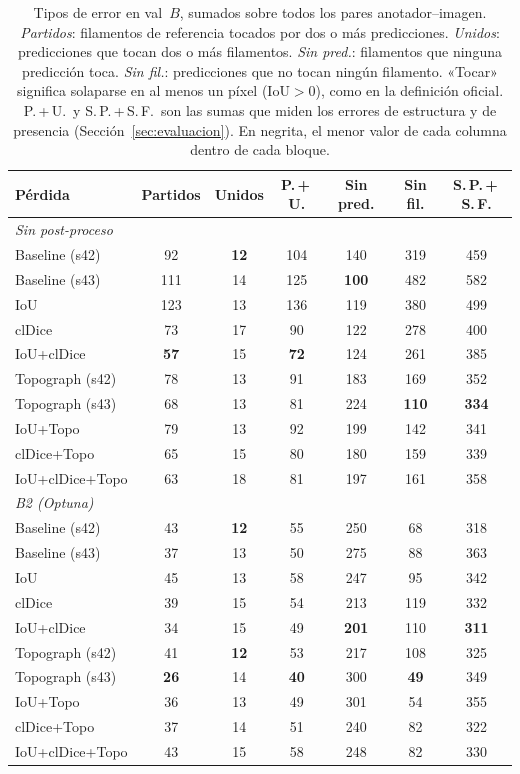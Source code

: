 \begin{table}[htbp]
\centering
\small
\begin{tabular}{@{}lcccccc@{}}
\toprule
Pérdida & Partidos & Unidos & P.\,+\,U. & Sin pred. & Sin fil. & S.\,P.\,+\,S.\,F.\\
\midrule
\multicolumn{7}{l}{\emph{Sin post-proceso}}\\
Baseline (s42) & 92 & \textbf{12} & 104 & 140 & 319 & 459\\
Baseline (s43) & 111 & 14 & 125 & \textbf{100} & 482 & 582\\
IoU & 123 & 13 & 136 & 119 & 380 & 499\\
clDice & 73 & 17 & 90 & 122 & 278 & 400\\
IoU+clDice & \textbf{57} & 15 & \textbf{72} & 124 & 261 & 385\\
Topograph (s42) & 78 & 13 & 91 & 183 & 169 & 352\\
Topograph (s43) & 68 & 13 & 81 & 224 & \textbf{110} & \textbf{334}\\
IoU+Topo & 79 & 13 & 92 & 199 & 142 & 341\\
clDice+Topo & 65 & 15 & 80 & 180 & 159 & 339\\
IoU+clDice+Topo & 63 & 18 & 81 & 197 & 161 & 358\\
\midrule
\multicolumn{7}{l}{\emph{B2 (Optuna)}}\\
Baseline (s42) & 43 & \textbf{12} & 55 & 250 & 68 & 318\\
Baseline (s43) & 37 & 13 & 50 & 275 & 88 & 363\\
IoU & 45 & 13 & 58 & 247 & 95 & 342\\
clDice & 39 & 15 & 54 & 213 & 119 & 332\\
IoU+clDice & 34 & 15 & 49 & \textbf{201} & 110 & \textbf{311}\\
Topograph (s42) & 41 & \textbf{12} & 53 & 217 & 108 & 325\\
Topograph (s43) & \textbf{26} & 14 & \textbf{40} & 300 & \textbf{49} & 349\\
IoU+Topo & 36 & 13 & 49 & 301 & 54 & 355\\
clDice+Topo & 37 & 14 & 51 & 240 & 82 & 322\\
IoU+clDice+Topo & 43 & 15 & 58 & 248 & 82 & 330\\
\bottomrule
\end{tabular}
\caption{Tipos de error en val~$B$, sumados sobre todos los pares
anotador--imagen. \emph{Partidos}: filamentos de referencia tocados por
dos o más predicciones. \emph{Unidos}: predicciones que tocan dos o más
filamentos. \emph{Sin pred.}: filamentos que ninguna predicción toca.
\emph{Sin fil.}: predicciones que no tocan ningún filamento. «Tocar»
significa solaparse en al menos un píxel ($\mathrm{IoU}>0$), como en la
definición oficial. P.\,+\,U.\ y S.\,P.\,+\,S.\,F.\ son las sumas que
miden los errores de estructura y de presencia
(Sección~\ref{sec:evaluacion}). En negrita, el menor valor de cada
columna dentro de cada bloque.}
\label{tab:res-asignaciones}

\end{table}

